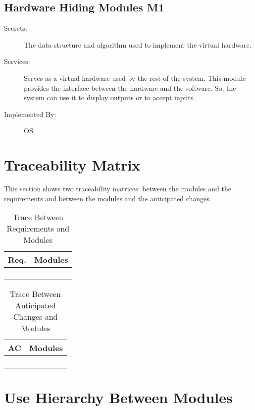 \documentclass[12pt]{article}
\begin{document}
\subsection{Hardware Hiding Modules \textbf{M1}}

\begin{description}
\item[Secrets:]The data structure and algorithm used to implement the virtual
  hardware.
\item[Services:]Serves as a virtual hardware used by the rest of the
  system. This module provides the interface between the hardware and the
  software. So, the system can use it to display outputs or to accept inputs.
\item[Implemented By:] OS
\end{description}



\section{Traceability Matrix}
This section shows two traceability matrices: between the modules and 
the 
requirements and between the modules and the anticipated changes. 
\smallskip
\begin{table}[!htbp]
	\centering
	\begin{tabular}{p{3cm}|p{9cm}}
		\textbf{Req.} & \textbf{Modules} \\\hline
		&  \\
		&  \\
		&  \\
		&  \\\hline
	\end{tabular}
	\caption{Trace Between Requirements and Modules}
	\label{Trace Between Requirements and Modules}
\end{table}
\begin{table}[!htbp]
	\centering
	\begin{tabular}{p{3cm}|p{9cm}}
		\textbf{AC} & \textbf{Modules} \\\hline
		&  \\
		&  \\
		&  \\
		&  \\\hline
	\end{tabular}
	\caption{Trace Between Anticipated Changes and Modules}
	\label{Trace Between Anticipated Changes and Modules}
\end{table}
\smallskip
\section{Use Hierarchy Between Modules}
\end{document}

